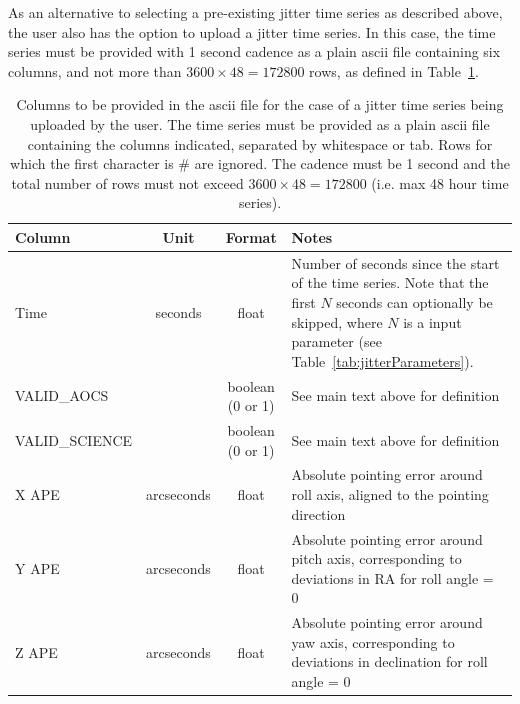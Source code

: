 \documentclass[11pt]{article}      %
\def\HCode#1{}
\def\htmlanchor#1{\HCode{<a id="#1"></a>}}
\begin{document}
\htmlanchor{jitterUploadFile}
As an alternative to selecting a pre-existing jitter time series as described above, the user also has the option to upload a jitter time series. In this case, the time series must be provided with 1 second cadence as a plain ascii file containing six columns, and not more than $3600\times48=172800$ rows, as defined in Table~\ref{tab:jitterUploadFormat}.


\begin{table}[hbtp]
  \begin{center}
  \caption{Columns to be provided in the ascii file for the case of a jitter time series being uploaded by the user. The time series must be provided as a plain ascii file containing the columns indicated, separated by whitespace or tab. Rows for which the first character is \# are ignored. The cadence must be 1 second and the total number of rows must not exceed $3600\times48=172800$ (i.e. max 48 hour time series).}
  \begin{tabular}{| l | c | c | p{8cm} |}
    \hline
Column & Unit & Format & Notes\\
    \hline
Time & seconds & float & Number of seconds since the start of the time series. Note that the first $N$ seconds can optionally be skipped, where $N$ is a input parameter (see Table~\ref{tab:jitterParameters}).\\
VALID\_AOCS & & boolean (0 or 1) & See main text above for definition\\
VALID\_SCIENCE & & boolean (0 or 1) & See main text above for definition\\
X APE & arcseconds & float & Absolute pointing error around roll axis, aligned to the pointing direction\\
Y APE & arcseconds & float & Absolute pointing error around pitch axis, corresponding to deviations in RA for roll angle = 0\\
Z APE & arcseconds & float & Absolute pointing error around yaw axis, corresponding to deviations in declination for roll angle = 0\\
    \hline
  \end{tabular}
  \label{tab:jitterUploadFormat}
\end{center}
\end{table}
\end{document}
